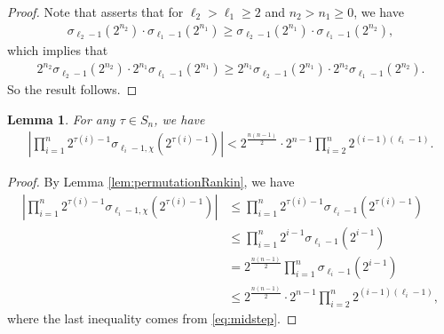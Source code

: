 \documentclass[11pt,letterpaper,reqno]{amsart}
\numberwithin{figure}{section}
\numberwithin{table}{section}
\theoremstyle{definition}
\theoremstyle{plain}
\newtheorem{lemma}[theorem]{Lemma}
\theoremstyle{definition}
\theoremstyle{definition}
\theoremstyle{remark}
\numberwithin{equation}{section}
\theoremstyle{remark}
\begin{document}
\begin{proof}
 Note that   \cite[Lemma 2.4]{oddperiods} asserts that for $\ell_2>\ell_1\geq2$ and $n_2>n_1\geq0$, we have
 \begin{align*}
     \sigma_{\ell_2-1}(2^{n_2})\cdot\sigma_{\ell_1-1}(2^{n_1})\geq  \sigma_{\ell_2-1}(2^{n_1})\cdot\sigma_{\ell_1-1}(2^{n_2}),
 \end{align*}
which implies that
\begin{align*}
         2^{n_2}\sigma_{\ell_2-1}(2^{n_2})\cdot2^{n_1}\sigma_{\ell_1-1}(2^{n_1})\geq  2^{n_1}\sigma_{\ell_2-1}(2^{n_1})\cdot2^{n_2}\sigma_{\ell_1-1}(2^{n_2}).
\end{align*}
So the result follows.
\end{proof}
\begin{lemma}
    For any $\tau\in S_n$, we have 
    \begin{align*}
        \left|\prod_{i=1}^n2^{\tau(i)-1}\sigma_{\ell_i-1,\chi}(2^{\tau(i)-1})\right|<2^{\frac{n(n-1)}{2}}\cdot2^{n-1}\prod_{i=2}^n2^{(i-1)(\ell_i-1)}.
    \end{align*}
\end{lemma}
\begin{proof}
    By Lemma \ref{lem:permutationRankin}, we have
   \begin{align*}
        \left|\prod_{i=1}^n2^{\tau(i)-1}\sigma_{\ell_i-1,\chi}(2^{\tau(i)-1})\right|&\leq \prod_{i=1}^n2^{\tau(i)-1}\sigma_{\ell_i-1}(2^{\tau(i)-1})\\&\leq\prod_{i=1}^n2^{i-1}\sigma_{\ell_i-1}(2^{i-1})\\&=2^{\frac{n(n-1)}{2}}\prod_{i=1}^n\sigma_{\ell_i-1}(2^{i-1})\\&\leq2^{\frac{n(n-1)}{2}}\cdot2^{n-1}\prod_{i=2}^n2^{(i-1)(\ell_i-1)},
        \end{align*}
        where the last inequality comes from \eqref{eq:midstep}.
\end{proof}
\end{document}
